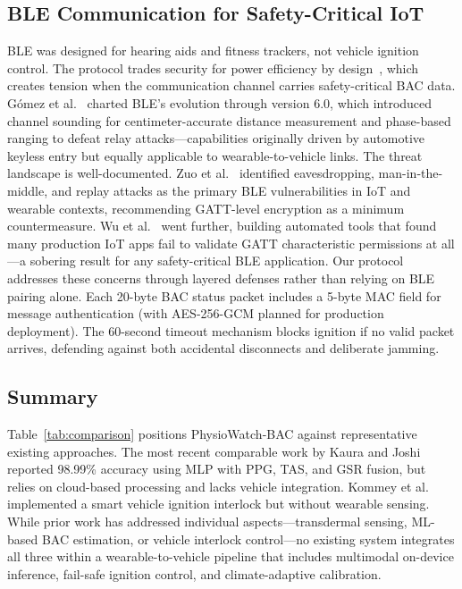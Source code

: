 \documentclass[HARVARD,Times2COL]{WileyNJDv5} %
\begin{document}
\subsection{BLE Communication for Safety-Critical IoT}
BLE was designed for hearing aids and fitness trackers, not vehicle ignition control. The protocol trades security for power efficiency by design~\citep{lonzetta2018}, which creates tension when the communication channel carries safety-critical BAC data. G{\'o}mez et al.~\citep{gomez2025} charted BLE's evolution through version 6.0, which introduced channel sounding for centimeter-accurate distance measurement and phase-based ranging to defeat relay attacks---capabilities originally driven by automotive keyless entry but equally applicable to wearable-to-vehicle links.
The threat landscape is well-documented. Zuo et al.~\citep{zuo2022} identified eavesdropping, man-in-the-middle, and replay attacks as the primary BLE vulnerabilities in IoT and wearable contexts, recommending GATT-level encryption as a minimum countermeasure. Wu et al.~\citep{wu2023bleguide} went further, building automated tools that found many production IoT apps fail to validate GATT characteristic permissions at all---a sobering result for any safety-critical BLE application.
Our protocol addresses these concerns through layered defenses rather than relying on BLE pairing alone. Each 20-byte BAC status packet includes a 5-byte MAC field for message authentication (with AES-256-GCM planned for production deployment). The 60-second timeout mechanism blocks ignition if no valid packet arrives, defending against both accidental disconnects and deliberate jamming.

\subsection{Summary}
Table~\ref{tab:comparison} positions PhysioWatch-BAC against representative existing approaches. The most recent comparable work by Kaura and Joshi~\citep{kaura2025} reported 98.99\% accuracy using MLP with PPG, TAS, and GSR fusion, but relies on cloud-based processing and lacks vehicle integration. Kommey et al.~\citep{kommey2022} implemented a smart vehicle ignition interlock but without wearable sensing. While prior work has addressed individual aspects---transdermal sensing, ML-based BAC estimation, or vehicle interlock control---no existing system integrates all three within a wearable-to-vehicle pipeline that includes multimodal on-device inference, fail-safe ignition control, and climate-adaptive calibration.
\end{document}
